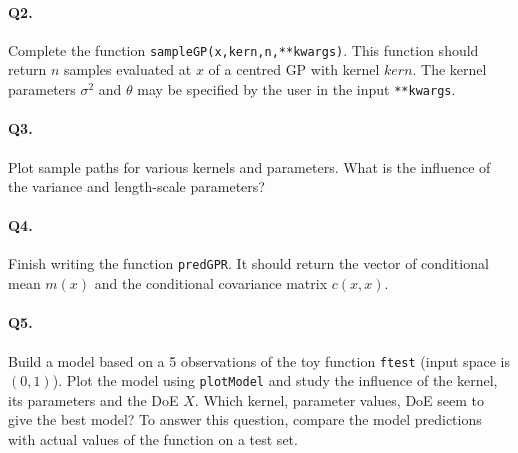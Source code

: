 \documentclass[12pt]{scrartcl}
\begin{document}
\paragraph{Q2.} Complete the function \texttt{sampleGP(x,kern,n,**kwargs)}. This function should return $n$ samples evaluated at $x$ of a centred GP with kernel $kern$. The kernel parameters $\sigma^2$ and $\theta$ may be specified by the user in the input \texttt{**kwargs}.

\paragraph{Q3.} Plot sample paths for various kernels and parameters. What is the influence of the variance and length-scale parameters?

\paragraph{Q4.} Finish writing the function \texttt{predGPR}. It should return the vector of conditional mean $m(x)$ and the conditional covariance matrix $c(x,x)$.

\paragraph{Q5.} Build a model based on a 5 observations of the toy function \texttt{ftest} (input space is $(0,1)$). Plot the model using \texttt{plotModel} and study the influence of the kernel, its parameters and the DoE $X$. Which kernel, parameter values, DoE seem to give the best model? To answer this question, compare the model predictions with actual values of the function on a test set. 
\end{document}
